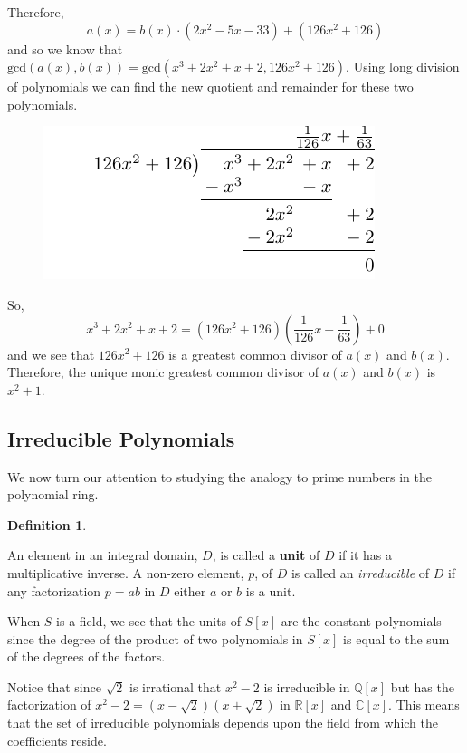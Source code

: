 \documentclass[
]{book}
\theoremstyle{definition}
\newtheorem{definition}{Definition}[chapter]
\theoremstyle{definition}
\theoremstyle{definition}
\theoremstyle{definition}
\theoremstyle{remark}
\begin{document}
Therefore,
\[a(x)=b(x) \cdot (2x^2-5x-33) + (126x^2 + 126)\] and so we know that \(\mathrm{gcd}(a(x),b(x))= \mathrm{gcd}(x^3+2x^2+x+2, 126x^2+126)\). Using long division of polynomials we can find the new quotient and remainder for these two polynomials.

\begin{figure}

{\centering \includegraphics[width=0.5\linewidth]{tikz/polynomial-division2} 

}

\end{figure}

So, \[x^3+2x^2+x+2 = (126x^2+126)\left(\frac{1}{126}x+\frac{1}{63}\right)+ 0\] and we see that \(126x^2+126\) is a greatest common divisor of \(a(x)\) and \(b(x)\). Therefore, the unique monic greatest common divisor of \(a(x)\) and \(b(x)\) is \(x^2+1\).

\hypertarget{irreducible-polynomials}{%
\subsection{Irreducible Polynomials}\label{irreducible-polynomials}}

We now turn our attention to studying the analogy to prime numbers in the polynomial ring.

\begin{definition}
\protect\hypertarget{def:unlabeled-div-127}{}\label{def:unlabeled-div-127}

An element in an integral domain, \(D\), is called a \textbf{unit} of \(D\) if it has a multiplicative inverse. A non-zero element, \(p\), of \(D\) is called an \emph{irreducible} of \(D\) if any factorization \(p=ab\) in \(D\) either \(a\) or \(b\) is a unit.

\end{definition}

When \(S\) is a field, we see that the units of \(S[x]\) are the constant polynomials since the degree of the product of two polynomials in \(S[x]\) is equal to the sum of the degrees of the factors.

Notice that since \(\sqrt{2}\) is irrational that \(x^2-2\) is irreducible in \(\mathbb{Q}[x]\) but has the factorization of \(x^2-2=(x-\sqrt{2})(x+\sqrt{2})\) in \(\mathbb{R}[x]\) and \(\mathbb{C}[x]\). This means that the set of irreducible polynomials depends upon the field from which the coefficients reside.
\end{document}
